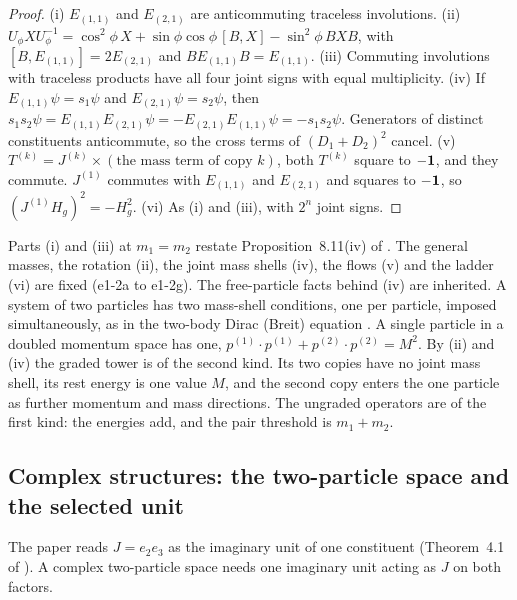 \begin{proof}
(i) $E_{(1,1)}$ and $E_{(2,1)}$ are anticommuting traceless involutions. (ii) $U_\phi XU_\phi^{-1}=\cos^2\!\phi\,X+\sin\phi\cos\phi\,[B,X]-\sin^2\!\phi\,BXB$, with
$[B,E_{(1,1)}]=2E_{(2,1)}$ and $BE_{(1,1)}B=E_{(1,1)}$. (iii) Commuting involutions with traceless products have all four joint signs with equal
multiplicity. (iv) If $E_{(1,1)}\psi=s_1\psi$ and $E_{(2,1)}\psi=s_2\psi$, then $s_1s_2\psi=E_{(1,1)}E_{(2,1)}\psi=-E_{(2,1)}E_{(1,1)}\psi=-s_1s_2\psi$. Generators of
distinct constituents anticommute, so the cross terms of $(D_1+D_2)^2$ cancel. (v) $T^{(k)}=J^{(k)}\times(\text{the mass term of copy }k)$, both
$T^{(k)}$ square to $-\mathbf 1$, and they commute. $J^{(1)}$ commutes with $E_{(1,1)}$ and $E_{(2,1)}$ and squares to $-\mathbf 1$, so
$(J^{(1)}H_g)^2=-H_g^2$. (vi) As (i) and (iii), with $2^n$ joint signs.
\end{proof}

Parts (i) and (iii) at $m_1=m_2$ restate Proposition~8.11(iv) of \cite{RE}. The general masses, the rotation (ii), the joint mass shells
(iv), the flows (v) and the ladder (vi) are fixed (e1-2a to e1-2g). The free-particle facts behind (iv) are inherited. A system of two
particles has two mass-shell conditions, one per particle, imposed simultaneously, as in the two-body Dirac (Breit) equation
\cite{Breit29}. A single particle in a doubled momentum space has one, $p^{(1)}\cdot p^{(1)}+p^{(2)}\cdot p^{(2)}=M^2$. By (ii) and (iv)
the graded tower is of the second kind. Its two copies have no joint mass shell, its rest energy is one value $M$, and the second copy
enters the one particle as further momentum and mass directions. The ungraded operators are of the first kind: the energies add, and
the pair threshold is $m_1+m_2$.

\subsection{Complex structures: the two-particle space and the selected unit}
\label{e1:sec:complex}

The paper reads $J=e_2e_3$ as the imaginary unit of one constituent (Theorem~4.1 of \cite{ES17}). A complex two-particle space needs one
imaginary unit acting as $J$ on both factors.

